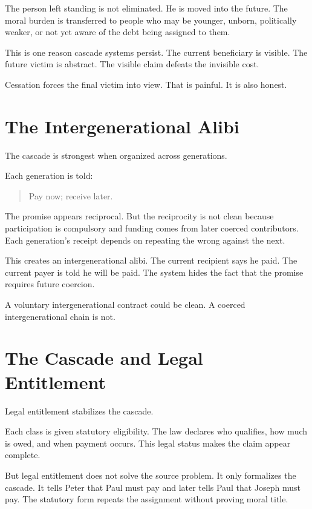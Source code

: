 \documentclass[12pt]{article}
\begin{document}
The person left standing is not eliminated. He is moved into the future. The moral burden is transferred to people who may be younger, unborn, politically weaker, or not yet aware of the debt being assigned to them.

This is one reason cascade systems persist. The current beneficiary is visible. The future victim is abstract. The visible claim defeats the invisible cost.

Cessation forces the final victim into view. That is painful. It is also honest.

\section{The Intergenerational Alibi}

The cascade is strongest when organized across generations.

Each generation is told:

\begin{quote}
Pay now; receive later.
\end{quote}

The promise appears reciprocal. But the reciprocity is not clean because participation is compulsory and funding comes from later coerced contributors. Each generation's receipt depends on repeating the wrong against the next.

This creates an intergenerational alibi. The current recipient says he paid. The current payer is told he will be paid. The system hides the fact that the promise requires future coercion.

A voluntary intergenerational contract could be clean. A coerced intergenerational chain is not.

\section{The Cascade and Legal Entitlement}

Legal entitlement stabilizes the cascade.

Each class is given statutory eligibility. The law declares who qualifies, how much is owed, and when payment occurs. This legal status makes the claim appear complete.

But legal entitlement does not solve the source problem. It only formalizes the cascade. It tells Peter that Paul must pay and later tells Paul that Joseph must pay. The statutory form repeats the assignment without proving moral title.
\end{document}
